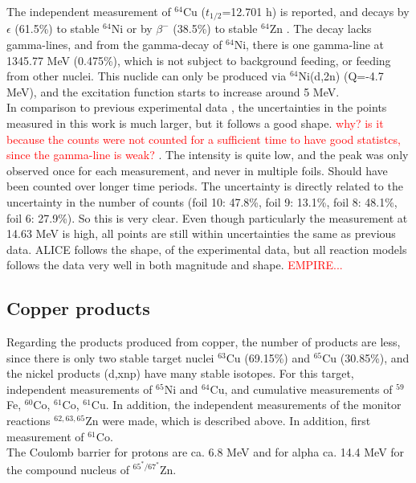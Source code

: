 \subsubsection{}
The independent measurement of $^{64}$Cu ($t_{1/2}$=12.701 h) is reported, and  decays by $\epsilon$ (61.5\%) to stable $^{64}$Ni or by $\beta^-$ (38.5\%) to stable $^{64}$Zn \cite{Singh2007a}. The decay lacks gamma-lines, and from the gamma-decay of $^{64}$Ni, there is one gamma-line at 1345.77 MeV (0.475\%), which is not subject to background feeding, or feeding from other nuclei. This nuclide can only be produced via $^{64}$Ni(d,2n) (Q=-4.7 MeV), and the excitation function starts to increase around 5 MeV.\\

\noindent 
In comparison to previous experimental data \cite{Zweit1991,Avrigeanu2016,Takacs2007}, the uncertainties in the points measured in this work is much larger, but it follows a good shape. \textcolor{red}{why? is it because the counts were not counted for a sufficient time to have good statistcs, since the gamma-line is weak? }. The intensity is quite low, and the peak was only observed once for each measurement, and never in multiple foils. Should have been counted over longer time periods. The uncertainty is directly related to the uncertainty in the number of counts (foil 10: 47.8\%, foil 9: 13.1\%, foil 8: 48.1\%, foil 6: 27.9\%). So this is very clear. Even though particularly the measurement at 14.63 MeV is high, all points are still within uncertainties the same as previous data. ALICE follows the shape, of the experimental data, but all reaction models follows the data very well in both magnitude and shape. \textcolor{red}{EMPIRE...}  


\subsection{Copper products}
Regarding the products produced from copper, the number of products are less, since there is only two stable target nuclei $^{63}$Cu (69.15\%) and $^{65}$Cu (30.85\%), and the nickel products (d,xnp) have many stable isotopes. For this target, independent measurements of $^{65}$Ni and $^{64}$Cu, and cumulative measurements of $^{59}$Fe, $^{60}$Co, $^{61}$Co, $^{61}$Cu. In addition, the independent measurements of the monitor reactions $^{62,63,65}$Zn were made, which is described above. In addition, first measurement of $^{61}$Co.  \\
The Coulomb barrier for protons are ca. 6.8 MeV and for alpha ca. 14.4 MeV for the compound nucleus of $^{65^*/67^*}$Zn. \\

